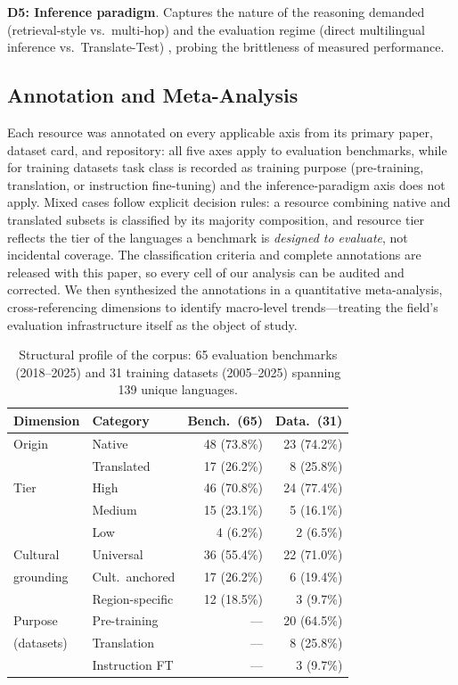 \documentclass[letterpaper]{article} %
\begin{document}
\textbf{D5: Inference paradigm}. Captures the nature of the reasoning demanded (retrieval-style vs.\ multi-hop) and the evaluation regime (direct multilingual inference vs.\ Translate-Test) \cite{conneau2018xnlievaluatingcrosslingualsentence}, probing the brittleness of measured performance.
 
\subsection{Annotation and Meta-Analysis}
Each resource was annotated on every applicable axis from its primary paper, dataset card, and repository: all five axes apply to evaluation benchmarks, while for training datasets task class is recorded as training purpose (pre-training, translation, or instruction fine-tuning) and the inference-paradigm axis does not apply. Mixed cases follow explicit decision rules: a resource combining native and translated subsets is classified by its majority composition, and resource tier reflects the tier of the languages a benchmark is \emph{designed to evaluate}, not incidental coverage. The classification criteria and complete annotations are released with this paper, so every cell of our analysis can be audited and corrected. We then synthesized the annotations in a quantitative meta-analysis, cross-referencing dimensions to identify macro-level trends---treating the field's evaluation infrastructure itself as the object of study.
 
\begin{table}[t]
\centering
\small
\begin{tabular}{@{}llrr@{}}
\toprule
\textbf{Dimension} & \textbf{Category} & \textbf{Bench.\ (65)} & \textbf{Data.\ (31)} \\
\midrule
Origin & Native & 48 (73.8\%) & 23 (74.2\%) \\
 & Translated & 17 (26.2\%) & 8 (25.8\%) \\
\midrule
Tier & High & 46 (70.8\%) & 24 (77.4\%) \\
 & Medium & 15 (23.1\%) & 5 (16.1\%) \\
 & Low & 4 (6.2\%) & 2 (6.5\%) \\
\midrule
Cultural & Universal & 36 (55.4\%) & 22 (71.0\%) \\
grounding & Cult.\ anchored & 17 (26.2\%) & 6 (19.4\%) \\
 & Region-specific & 12 (18.5\%) & 3 (9.7\%) \\
\midrule
Purpose & Pre-training & --- & 20 (64.5\%) \\
(datasets) & Translation & --- & 8 (25.8\%) \\
 & Instruction FT & --- & 3 (9.7\%) \\
\bottomrule
\end{tabular}
\caption{Structural profile of the corpus: 65 evaluation benchmarks (2018--2025) and 31 training datasets (2005--2025) spanning 139 unique languages.}
\label{tab:profile}
\end{table}
 
\end{document}
